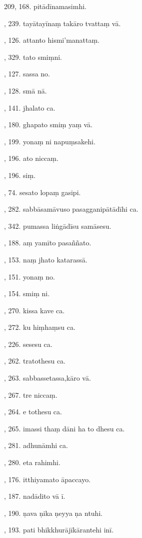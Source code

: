 209, 168. pitādīnamasimhi.\par {}, 239. tayātayīnaṃ takāro tvattaṃ vā.\par {}, 126. attanto hismi’manattaṃ.\par {}, 329. tato smiṃni.\par {}, 127. sassa no.\par {}, 128. smā nā.\par {}, 141. jhalato ca.\par {}, 180. ghapato smiṃ yaṃ vā.\par {}, 199. yonaṃ ni napuṃsakehi.\par {}, 196. ato niccaṃ.\par {}, 196. siṃ.\par {}, 74. sesato lopaṃ gasipi.\par {}, 282. sabbāsamāvuso pasagganipātādīhi ca.\par {}, 342. pumassa liṅgādīsu samāsesu.\par {}, 188. aṃ yamīto pasaññato.\par {}, 153. naṃ jhato katarassā.\par {}, 151. yonaṃ no.\par {}, 154. smiṃ ni.\par {}, 270. kissa kave ca.\par {}, 272. ku hiṃhaṃsu ca.\par {}, 226. sesesu ca.\par {}, 262. tratothesu ca.\par {}, 263. sabbassetassa,kāro vā.\par {}, 267. tre niccaṃ.\par {}, 264. e tothesu ca.\par {}, 265. imassi thaṃ dāni ha to dhesu ca.\par {}, 281. adhunāmhi ca.\par {}, 280. eta rahimhi.\par {}, 176. itthiyamato āpaccayo.\par {}, 187. nadādito vā ī.\par {}, 190. ṇava ṇika ṇeyya ṇa ntuhi.\par {}, 193. pati bhikkhurājīkārantehi inī.\par \noindent
